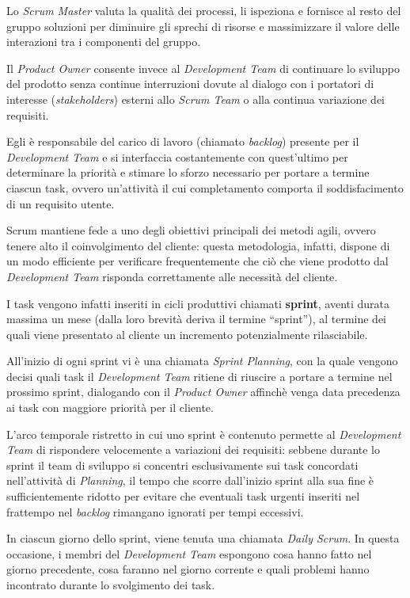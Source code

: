 Lo \emph{Scrum Master} valuta la qualità dei processi, li ispeziona e fornisce
al resto del gruppo soluzioni per diminuire gli sprechi di risorse e
massimizzare il valore delle interazioni tra i componenti del gruppo.

Il \emph{Product Owner} consente invece al \emph{Development Team} di
continuare lo sviluppo del prodotto senza continue interruzioni dovute
al dialogo con i portatori di interesse (\emph{stakeholders}) esterni allo
\emph{Scrum Team} o alla continua variazione dei requisiti.

Egli è responsabile del carico di lavoro (chiamato \emph{backlog}) presente per
il \emph{Development Team} e si interfaccia costantemente con quest'ultimo per
determinare la priorità e stimare lo sforzo necessario per portare a termine
ciascun task, ovvero un'attività il cui completamento comporta il
soddisfacimento di un requisito utente.

Scrum mantiene fede a uno degli obiettivi principali dei metodi agili, ovvero
tenere alto il coinvolgimento del cliente: questa metodologia, infatti, dispone
di un modo efficiente per verificare frequentemente che ciò che viene prodotto
dal \emph{Development Team} risponda correttamente alle necessità del cliente.

I task vengono infatti inseriti in cicli produttivi chiamati \textbf{sprint},
aventi durata massima un mese (dalla loro brevità deriva il termine
``sprint''), al termine dei quali viene presentato al cliente un incremento
potenzialmente rilasciabile.

All'inizio di ogni sprint vi è una  chiamata \emph{Sprint
Planning}, con la quale vengono decisi quali task il \emph{Development Team}
ritiene di riuscire a portare a termine nel prossimo sprint, dialogando con il
\emph{Product Owner} affinchè venga data precedenza ai task con maggiore
priorità per il cliente.

L'arco temporale ristretto in cui uno sprint è contenuto permette al
\emph{Development Team} di rispondere velocemente a variazioni dei requisiti:
sebbene durante lo sprint il team di sviluppo si concentri esclusivamente sui
task concordati nell'attività di \emph{Planning}, il tempo che scorre
dall'inizio sprint alla sua fine è sufficientemente ridotto per evitare che
eventuali task urgenti inseriti nel frattempo nel \emph{backlog} rimangano
ignorati per tempi eccessivi.

In ciascun giorno dello sprint, viene tenuta una  chiamata
\emph{Daily Scrum}. In questa occasione, i membri del \emph{Development Team}
espongono cosa hanno fatto nel giorno precedente, cosa faranno nel giorno
corrente e quali problemi hanno incontrato durante lo svolgimento dei task.

